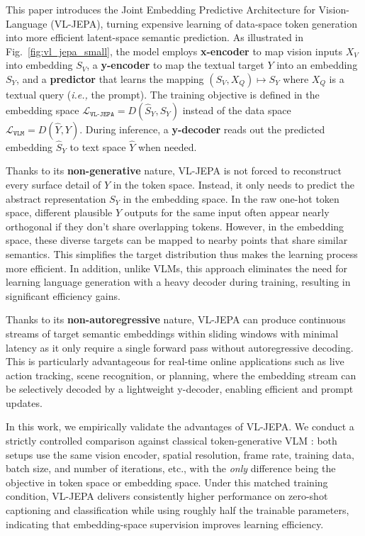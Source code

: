 This paper introduces the Joint Embedding Predictive Architecture for Vision-Language (VL-JEPA), turning expensive learning of data-space token generation into more efficient latent-space semantic prediction. As illustrated in Fig.~\ref{fig:vl_jepa_small}, the model employs \textbf{x-encoder} to map vision inputs $X_V$ into embedding $S_V$, a \textbf{y-encoder} to map the textual target $Y$ into an embedding $S_Y$, and a \textbf{predictor} that learns the mapping $(S_V, X_Q) \mapsto S_Y$ where $X_Q$ is a textual query (\textit{i.e.,} the prompt). The training objective is defined in the embedding space $\mathcal{L}_\texttt{VL-JEPA} = D(\hat{S}_Y, S_Y)$ instead of the data space $\mathcal{L}_\texttt{VLM} = D(\hat{Y}, Y)$. During inference, a \textbf{y-decoder} reads out the predicted embedding $\hat{S}_Y$ to text space $\hat{Y}$ when needed.


Thanks to its \textbf{non-generative} nature, VL-JEPA is not forced to reconstruct every surface detail of $Y$ in the token space. Instead, it only needs to predict the abstract representation $S_Y$ in the embedding space. In the raw one-hot token space, different plausible $Y$ outputs for the same input often appear nearly orthogonal if they don't share overlapping tokens. However, in the embedding space, these diverse targets can be mapped to nearby points that share similar semantics. This simplifies the target distribution thus makes the learning process more efficient. In addition, unlike VLMs, this approach eliminates the need for learning language generation with a heavy decoder during training, resulting in significant efficiency gains.

Thanks to its \textbf{non-autoregressive} nature, VL-JEPA can produce continuous streams of target semantic embeddings within sliding windows with minimal latency as it only require a single forward pass without autoregressive decoding. This is particularly advantageous for real-time online applications such as live action tracking, scene recognition, or planning, where the embedding stream can be selectively decoded by a lightweight y-decoder, enabling efficient and prompt updates.

In this work, we empirically validate the advantages of VL-JEPA. We conduct a strictly controlled comparison against classical token-generative VLM \citep{liu2023visual, cho2025perceptionlm}: both setups use the same vision encoder, spatial resolution, frame rate, training data, batch size, and number of iterations, etc., with the \emph{only} difference being the objective in token space or embedding space. Under this matched training condition, VL-JEPA delivers consistently higher performance on zero-shot captioning and classification while using roughly half the trainable parameters, indicating that embedding-space supervision improves learning efficiency. 

